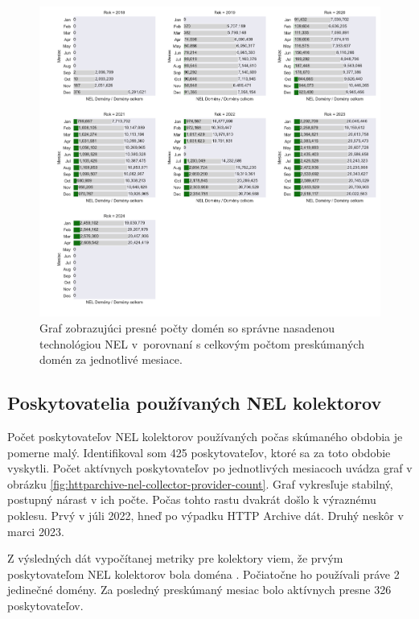 \begin{figure}[!htb]
\begin{center}
 \includegraphics[scale=0.518]{obrazky-figures/httparchive_nel_deployment_ratio_values.pdf}
 \caption{Graf zobrazujúci presné počty domén so správne nasadenou technológiou NEL \mbox{v porovnaní} s celkovým počtom preskúmaných domén za jednotlivé mesiace.}
 \label{fig:httparchive-nel-deployment_ratio_values}
\end{center}
\end{figure}

\pagebreak


\subsection{Poskytovatelia používaných NEL kolektorov}

Počet poskytovateľov NEL kolektorov používaných počas skúmaného obdobia je pomerne malý.
Identifikoval som 425 poskytovateľov, ktoré sa za toto obdobie vyskytli.
Počet aktívnych poskytovateľov po jednotlivých mesiacoch uvádza graf v obrázku \ref{fig:httparchive-nel-collector-provider-count}.
Graf vykresľuje stabilný, postupný nárast v ich počte.
Počas tohto rastu dvakrát došlo k výraznému poklesu.
Prvý v júli 2022, hneď po výpadku HTTP Archive dát.
Druhý neskôr v marci 2023.

Z výsledných dát vypočítanej metriky pre kolektory viem, že prvým poskytovateľom NEL kolektorov bola doména .
Počiatočne ho používali práve 2 jedinečné domény.
Za posledný preskúmaný mesiac bolo aktívnych presne 326 poskytovateľov.

